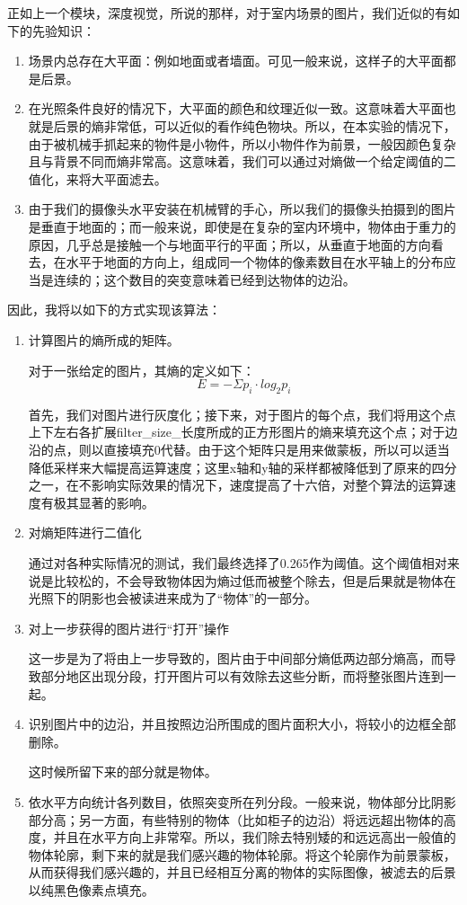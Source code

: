 \documentclass[a4paper,12pt]{article}
\begin{document}
正如上一个模块，深度视觉，所说的那样，对于室内场景的图片，我们近似的有如下的先验知识：
\begin{enumerate}
	\item 场景内总存在大平面：例如地面或者墙面。可见一般来说，这样子的大平面都是后景。
	\item 在光照条件良好的情况下，大平面的颜色和纹理近似一致。这意味着大平面也就是后景的熵非常低，可以近似的看作纯色物块。所以，在本实验的情况下，由于被机械手抓起来的物件是小物件，所以小物件作为前景，一般因颜色复杂且与背景不同而熵非常高。这意味着，我们可以通过对熵做一个给定阈值的二值化，来将大平面滤去。
	\item 由于我们的摄像头水平安装在机械臂的手心，所以我们的摄像头拍摄到的图片是垂直于地面的；而一般来说，即使是在复杂的室内环境中，物体由于重力的原因，几乎总是接触一个与地面平行的平面；所以，从垂直于地面的方向看去，在水平于地面的方向上，组成同一个物体的像素数目在水平轴上的分布应当是连续的；这个数目的突变意味着已经到达物体的边沿。
\end{enumerate}
因此，我将以如下的方式实现该算法：
\begin{enumerate}
	\item 计算图片的熵所成的矩阵。
	
	对于一张给定的图片，其熵的定义如下：
	\begin{equation}
		E = -\Sigma p_{i}\cdot log_{2}p_{i}
	\end{equation}
	
	首先，我们对图片进行灰度化；接下来，对于图片的每个点，我们将用这个点上下左右各扩展filter\_size\_长度所成的正方形图片的熵来填充这个点；对于边沿的点，则以直接填充0代替。由于这个矩阵只是用来做蒙板，所以可以适当降低采样来大幅提高运算速度；这里x轴和y轴的采样都被降低到了原来的四分之一，在不影响实际效果的情况下，速度提高了十六倍，对整个算法的运算速度有极其显著的影响。
	
	\item 对熵矩阵进行二值化
	
	通过对各种实际情况的测试，我们最终选择了0.265作为阈值。这个阈值相对来说是比较松的，不会导致物体因为熵过低而被整个除去，但是后果就是物体在光照下的阴影也会被读进来成为了“物体”的一部分。
	
	\item 对上一步获得的图片进行“打开”操作
	
	这一步是为了将由上一步导致的，图片由于中间部分熵低两边部分熵高，而导致部分地区出现分段，打开图片可以有效除去这些分断，而将整张图片连到一起。
	
	\item 识别图片中的边沿，并且按照边沿所围成的图片面积大小，将较小的边框全部删除。
	
	这时候所留下来的部分就是物体。
	
	\item 依水平方向统计各列数目，依照突变所在列分段。一般来说，物体部分比阴影部分高；另一方面，有些特别的物体（比如柜子的边沿）将远远超出物体的高度，并且在水平方向上非常窄。所以，我们除去特别矮的和远远高出一般值的物体轮廓，剩下来的就是我们感兴趣的物体轮廓。将这个轮廓作为前景蒙板，从而获得我们感兴趣的，并且已经相互分离的物体的实际图像，被滤去的后景以纯黑色像素点填充。
\end{enumerate}
\end{document}
